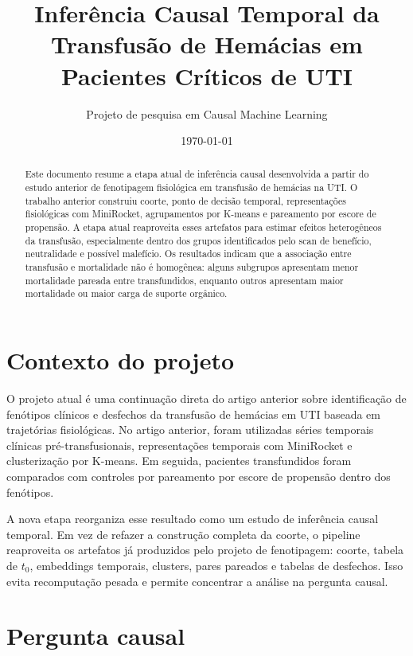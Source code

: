 \documentclass[12pt,a4paper]{article}
\title{Infer\^encia Causal Temporal da Transfus\~ao de Hem\'acias em Pacientes Cr\'iticos de UTI}
\author{Projeto de pesquisa em Causal Machine Learning}
\date{\today}
\begin{document}
\maketitle

\begin{abstract}
Este documento resume a etapa atual de infer\^encia causal desenvolvida a partir do estudo anterior de fenotipagem fisiol\'ogica em transfus\~ao de hem\'acias na UTI. O trabalho anterior construiu coorte, ponto de decis\~ao temporal, representa\c{c}\~oes fisiol\'ogicas com MiniRocket, agrupamentos por K-means e pareamento por escore de propens\~ao. A etapa atual reaproveita esses artefatos para estimar efeitos heterog\^eneos da transfus\~ao, especialmente dentro dos grupos identificados pelo scan de benef\'icio, neutralidade e poss\'ivel malef\'icio. Os resultados indicam que a associa\c{c}\~ao entre transfus\~ao e mortalidade n\~ao \'e homog\^enea: alguns subgrupos apresentam menor mortalidade pareada entre transfundidos, enquanto outros apresentam maior mortalidade ou maior carga de suporte org\^anico.
\end{abstract}

\section{Contexto do projeto}

O projeto atual \'e uma continua\c{c}\~ao direta do artigo anterior sobre identifica\c{c}\~ao de fen\'otipos cl\'inicos e desfechos da transfus\~ao de hem\'acias em UTI baseada em trajet\'orias fisiol\'ogicas. No artigo anterior, foram utilizadas s\'eries temporais cl\'inicas pr\'e-transfusionais, representa\c{c}\~oes temporais com MiniRocket e clusteriza\c{c}\~ao por K-means. Em seguida, pacientes transfundidos foram comparados com controles por pareamento por escore de propens\~ao dentro dos fen\'otipos.

A nova etapa reorganiza esse resultado como um estudo de infer\^encia causal temporal. Em vez de refazer a constru\c{c}\~ao completa da coorte, o pipeline reaproveita os artefatos j\'a produzidos pelo projeto de fenotipagem: coorte, tabela de $t_0$, embeddings temporais, clusters, pares pareados e tabelas de desfechos. Isso evita recomputa\c{c}\~ao pesada e permite concentrar a an\'alise na pergunta causal.

\section{Pergunta causal}
\end{document}
